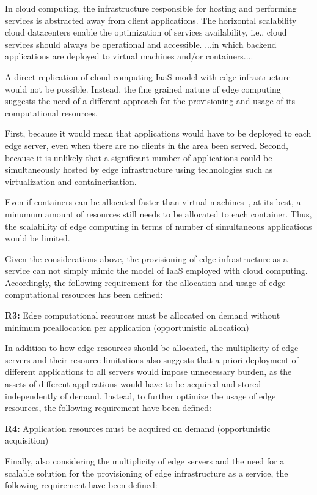 In cloud computing, the infrastructure responsible for hosting and performing services is abstracted away from client applications. The horizontal scalability cloud datacenters enable the optimization of services availability, i.e., cloud services should always be operational and accessible. ...in which backend applications are deployed to virtual machines and/or containers....

A direct replication of cloud computing IaaS model with edge infrastructure would not be possible. Instead, the fine grained nature of edge computing suggests the need of a different approach for the provisioning and usage of its computational resources. 

First, because it would mean that applications would have to be deployed to each edge server, even when there are no clients in the area been served. 
Second, because it is unlikely that a significant number of applications could be simultaneously hosted by edge infrastructure using technologies such as virtualization and containerization. 

Even if containers can be allocated faster than virtual machines~\cite{Giovanni}, at its best, a minumum amount of resources still needs to be allocated to each container. Thus, the scalability of edge computing in terms of number of simultaneous applications would be limited. 

Given the considerations above, the provisioning of edge infrastructure as a service can not simply mimic the model of IaaS employed with cloud computing. Accordingly, the following requirement for the allocation and usage of edge computational resources has been defined:
 
\textbf{R3:} Edge computational resources must be allocated on demand without minimum preallocation per application (opportunistic allocation) 
	
In addition to how edge resources should be allocated, the multiplicity of edge servers and their resource limitations also suggests that a priori deployment of different applications to all servers would impose unnecessary burden, as the assets of different applications would have to be acquired and stored independently of demand. Instead, to further optimize the usage of edge resources, the following requirement have been defined: 	

\textbf{R4:} Application resources must be acquired on demand (opportunistic acquisition) 

Finally, also considering the multiplicity of edge servers and the need for a scalable solution for the provisioning of edge infrastructure as a service, the following requirement have been defined:

